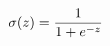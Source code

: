 \documentclass[preview]{standalone}
\begin{document}
\begin{align*}
\special{dvisvgm:raw <g id='unique000'>}\sigma(z)=\frac{1}{1+e^{-z}}\special{dvisvgm:raw </g>}
\end{align*}
\end{document}
